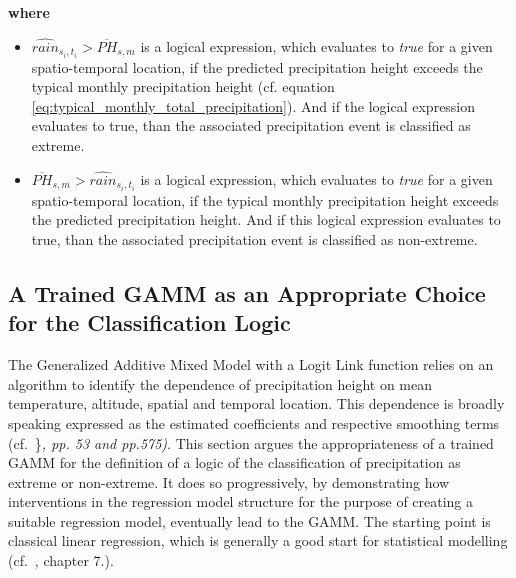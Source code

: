 \documentclass[
  12pt,
]{article}
\begin{document}
\begin{center}
\textbf{where}
\end{center}

\begin{itemize}[label={}]
\item $\widehat{rain}_{s_i,t_i} > \overline{PH}_{s,m}$ is a logical expression, which evaluates to \textit{true} for a given spatio-temporal location, if the predicted precipitation height exceeds the typical monthly precipitation height (cf. equation \ref{eq:typical_monthly_total_precipitation}). And if the logical expression evaluates to true, than the associated precipitation event is classified as extreme.
\item $\overline{PH}_{s,m} > \widehat{rain}_{s_i,t_i}$ is a logical expression, which evaluates to \textit{true} for a given spatio-temporal location, if the typical monthly precipitation height exceeds the predicted precipitation height. And if this logical expression evaluates to true, than the associated precipitation event is classified as non-extreme.
\end{itemize}

\endgroup

\hypertarget{a-trained-gamm-as-an-appropriate-choice-for-the-classification-logic}{%
\subsection{A Trained GAMM as an Appropriate Choice for the
Classification
Logic}\label{a-trained-gamm-as-an-appropriate-choice-for-the-classification-logic}}

The Generalized Additive Mixed Model with a Logit Link function relies
on an algorithm to identify the dependence of precipitation height on
mean temperature, altitude, spatial and temporal location. This
dependence is broadly speaking expressed as the estimated coefficients
and respective smoothing terms
(cf.~\cite{Wood.2017}\}\textbar{}\textit{\cite{Fahrmeir.2021}, pp. 53 and pp.575)}.
This section argues the appropriateness of a trained GAMM for the
definition of a logic of the classification of precipitation as extreme
or non-extreme. It does so progressively, by demonstrating how
interventions in the regression model structure for the purpose of
creating a suitable regression model, eventually lead to the GAMM. The
starting point is classical linear regression, which is generally a good
start for statistical modelling (cf.~\cite{Zumel.2014}, chapter 7.).
\newline
\end{document}
